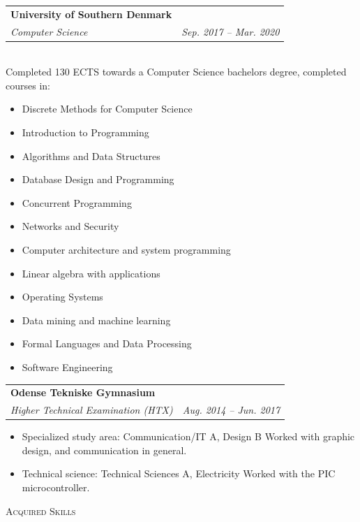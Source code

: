 \documentclass[11pt]{article}
\makeatletter
\newcommand{\resumeSubheading}[4]{
  \noindent\begin{tabular*}{0.98\textwidth}[t]{l@{\extracolsep{\fill}}r}
    \noindent \textbf{#1} & #2 \\ \vspace{-3pt} 
    \noindent \textit{\small#3} & \textit{\small #4} 
  \end{tabular*}\vspace{7pt}
}
\makeatother
\begin{document}
\resumeSubheading{University of Southern Denmark}{}{Computer Science}{Sep. 2017
-- Mar. 2020}\\\vspace{0.25cm} 
{\indent\small Completed 130 ECTS towards a Computer Science bachelors degree,
completed courses in:}
  \vspace{-0.3cm}
  {\footnotesize 
  \begin{itemize}
  \setlength{\itemsep}{-1pt}
    \item Discrete Methods for Computer Science
    \item Introduction to Programming
    \item Algorithms and Data Structures
    \item Database Design and Programming
    \item Concurrent Programming
    \item Networks and Security
    \item Computer architecture and system programming
    \item Linear algebra with applications
    \item Operating Systems
    \item Data mining and machine learning
    \item Formal Languages and Data Processing
    \item Software Engineering
\end{itemize}}
\vspace{0.3cm}

\resumeSubheading{Odense Tekniske Gymnasium}{}{Higher Technical
Examination (HTX)}{Aug. 2014 -- Jun. 2017}
{\small \begin{itemize}\vspace{-0.25cm}
  \setlength{\itemsep}{-1pt}
  \item Specialized study area: Communication/IT A, Design B
    \subitem Worked with graphic design, and communication in general.

  \item Technical science: Technical Sciences A, Electricity
    \subitem\footnotesize Worked with the PIC microcontroller.
\end{itemize}
} \vspace{0.5cm}

\newpage
\noindent\large{\scshape{Acquired Skills}} \newline
\noindent{\rule[0.3cm]{\textwidth}{0.4pt}}
\end{document}
